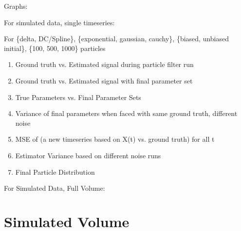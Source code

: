 Graphs: 

For simulated data, single timeseries:

For \{delta, DC/Spline\}, \{exponential, gaussian, cauchy\}, \{biased, unbiased initial\},
\{100, 500, 1000\} particles
\begin{enumerate}
\item Ground truth vs. Estimated signal during particle filter run
\item Ground truth vs. Estimated signal with final parameter set
\item True Parameters vs. Final Parameter Sets
\item Variance of final parameters when faced with same ground truth, different noise
\item MSE of (a new timeseries based on X(t) vs. ground truth) for all t
\item Estimator Variance based on different noise runs
\item Final Particle Distribution
\end{enumerate}

For Simulated Data, Full Volume:

\section{Simulated Volume}

